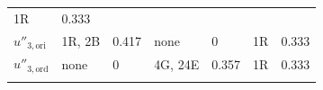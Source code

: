 \begin{longtable}[]{@{}lllllll@{}}
\begin{minipage}[t]{0.07\columnwidth}
1R\strut
\end{minipage} & \begin{minipage}[t]{0.15\columnwidth}\raggedright
0.333\strut
\end{minipage}\tabularnewline
\begin{minipage}[t]{0.13\columnwidth}\raggedright
\(u''_{3,\text{ori}}\)\strut
\end{minipage} & \begin{minipage}[t]{0.10\columnwidth}\raggedright
1R, 2B\strut
\end{minipage} & \begin{minipage}[t]{0.15\columnwidth}\raggedright
0.417\strut
\end{minipage} & \begin{minipage}[t]{0.06\columnwidth}\raggedright
none\strut
\end{minipage} & \begin{minipage}[t]{0.15\columnwidth}\raggedright
0\strut
\end{minipage} & \begin{minipage}[t]{0.07\columnwidth}\raggedright
1R\strut
\end{minipage} & \begin{minipage}[t]{0.15\columnwidth}\raggedright
0.333\strut
\end{minipage}\tabularnewline
\begin{minipage}[t]{0.13\columnwidth}\raggedright
\(u''_{3,\text{ord}}\)\strut
\end{minipage} & \begin{minipage}[t]{0.10\columnwidth}\raggedright
none\strut
\end{minipage} & \begin{minipage}[t]{0.15\columnwidth}\raggedright
0\strut
\end{minipage} & \begin{minipage}[t]{0.06\columnwidth}\raggedright
4G, 24E\strut
\end{minipage} & \begin{minipage}[t]{0.15\columnwidth}\raggedright
0.357\strut
\end{minipage} & \begin{minipage}[t]{0.07\columnwidth}\raggedright
1R\strut
\end{minipage} & \begin{minipage}[t]{0.15\columnwidth}\raggedright
0.333\strut
\end{minipage}\tabularnewline
\begin{minipage}[t]{0.13\columnwidth}\raggedright

\end{minipage}
\end{longtable}
